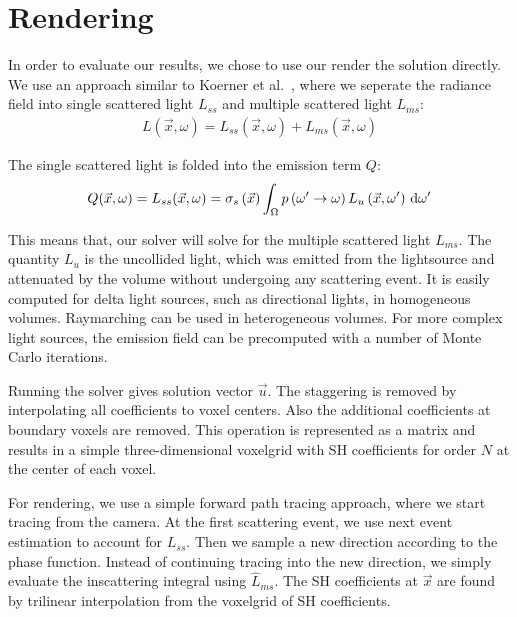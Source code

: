 \section{Rendering}
\label{sec:rendering}

In order to evaluate our results, we chose to use our render the solution directly. We use an approach similar to Koerner et al.~\cite{Koerner14}, where we seperate the radiance field into single scattered light $L_{ss}$ and multiple scattered light $L_{ms}$:
\begin{align}
L\left(\vec{x},\omega\right) = L_{ss}\left(\vec{x},\omega\right) + L_{ms}\left(\vec{x},\omega\right)
\end{align}

The single scattered light is folded into the emission term $Q$:
\begin{align}
Q(\vec{x}, \omega) = L_{ss}(\vec{x}, \omega) = \sigma_s\left(\vec{x}\right)\int_\Omega{ p\left(\omega'\rightarrow\omega\right) L_{u}\left(\vec{x}, \omega'\right)\,\mathrm{d}\omega' }
\end{align}

This means that, our solver will solve for the multiple scattered light $L_{ms}$. The quantity $L_u$ is the uncollided light, which was emitted from the lightsource and attenuated by the volume without undergoing any scattering event. It is easily computed for delta light sources, such as directional lights, in homogeneous volumes. Raymarching can be used in heterogeneous volumes. For more complex light sources, the emission field can be precomputed with a number of Monte Carlo iterations. 

Running the solver gives solution vector $\vec{u}$. The staggering is removed by interpolating all coefficients to voxel centers. Also the additional coefficients at boundary voxels are removed. This operation is represented as a matrix and results in a simple three-dimensional voxelgrid with SH coefficients for order $N$ at the center of each voxel.

For rendering, we use a simple forward path tracing approach, where we start tracing from the camera. At the first scattering event, we use next event estimation to account for $L_{ss}$. Then we sample a new direction according to the phase function. Instead of continuing tracing into the new direction, we simply evaluate the inscattering integral using $\widehat{L}_{ms}$. The SH coefficients at $\vec{x}$ are found by trilinear interpolation from the voxelgrid of SH coefficients.


